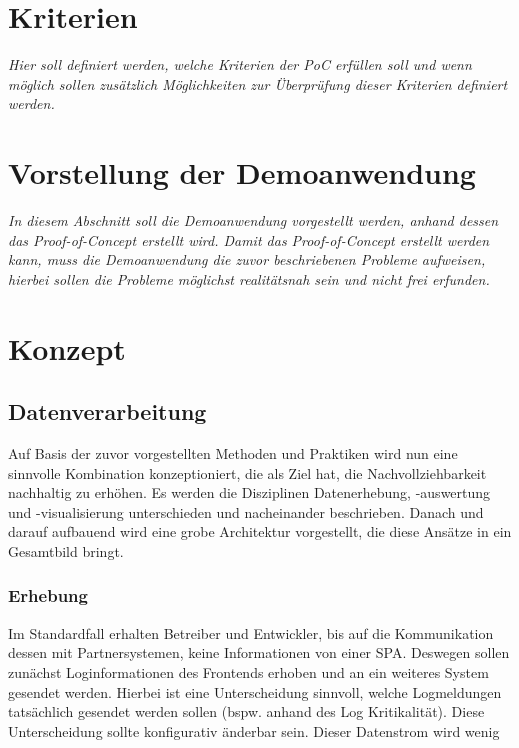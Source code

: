 	
\section{Kriterien}

	\textit{Hier soll definiert werden, welche Kriterien der PoC erfüllen soll und wenn möglich sollen zusätzlich Möglichkeiten zur Überprüfung dieser Kriterien definiert werden.}
	
\section{Vorstellung der Demoanwendung}

	\textit{In diesem Abschnitt soll die Demoanwendung vorgestellt werden, anhand dessen das Proof-of-Concept erstellt wird. Damit das Proof-of-Concept erstellt werden kann, muss die Demoanwendung die zuvor beschriebenen Probleme aufweisen, hierbei sollen die Probleme möglichst realitätsnah sein und nicht frei erfunden.}
	
\section{Konzept}
	
	\subsection{Datenverarbeitung}

	Auf Basis der zuvor vorgestellten Methoden und Praktiken wird nun eine sinnvolle Kombination konzeptioniert, die als Ziel hat, die Nachvollziehbarkeit nachhaltig zu erhöhen. Es werden die Disziplinen Datenerhebung, -auswertung und -visualisierung unterschieden und nacheinander beschrieben. Danach und darauf aufbauend wird eine grobe Architektur vorgestellt, die diese Ansätze in ein Gesamtbild bringt.
		
		\subsubsection{Erhebung}
		
		Im Standardfall erhalten Betreiber und Entwickler, bis auf die Kommunikation dessen mit Partnersystemen, keine Informationen von einer SPA. Deswegen sollen zunächst Loginformationen des Frontends erhoben und an ein weiteres System gesendet werden. Hierbei ist eine Unterscheidung sinnvoll, welche Logmeldungen tatsächlich gesendet werden sollen (bspw. anhand des Log Kritikalität). Diese Unterscheidung sollte konfigurativ änderbar sein. Dieser Datenstrom wird wenig 
		
